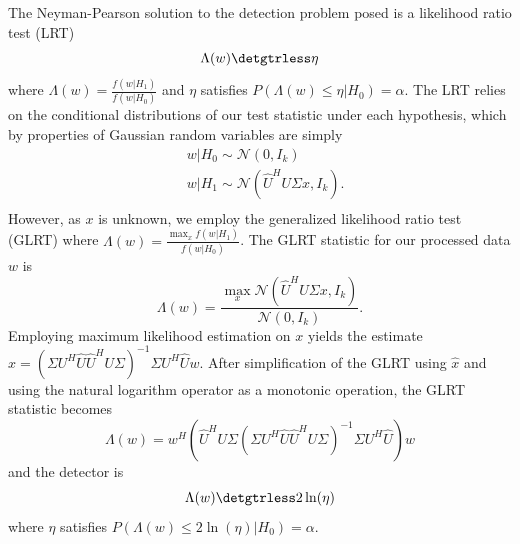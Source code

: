 The Neyman-Pearson solution to the detection problem posed is a likelihood ratio test (LRT)
\begin{equation*}
\Lambda(w) \detgtrless \eta
\end{equation*}
where $\Lambda(w) = \frac{f(w|H_1)}{f(w|H_0)}$ and $\eta$ satisfies $P(\Lambda(w)\leq\eta|H_0)=\alpha$. The LRT relies on the conditional distributions of our test statistic under each hypothesis, which by properties of Gaussian random variables are simply
\begin{equation*}
\begin{aligned}
&w|H_0\sim\mathcal{N}(0,I_{k})\\
&w|H_1\sim\mathcal{N}(\widehat{U}^HU\Sigma x, I_{k}).\\
\end{aligned}
\end{equation*}
However, as $x$ is unknown, we employ the generalized likelihood ratio test (GLRT) where $\Lambda(w) = \frac{\max_x f(w|H_1)}{f(w|H_0)}$. The GLRT statistic for our processed data $w$ is
\begin{equation*}
\Lambda(w)=\frac{\max_x\mathcal{N}(\widehat{U}^HU\Sigma x,I_{k})}{\mathcal{N}(0,I_{k})}.
\end{equation*}
Employing maximum likelihood estimation on $x$ yields the estimate $\widehat{x}=\left(\Sigma U^H\widehat{U}\widehat{U}^HU\Sigma\right)^{-1}\Sigma U^H\widehat{U}w$. After simplification of the GLRT using $\widehat{x}$ and using the natural logarithm operator as a monotonic operation, the GLRT statistic becomes
\begin{equation}\label{eq:oracle stat}
\Lambda(w) = w^H\left(\widehat{U}^HU\Sigma\left(\Sigma U^H\widehat{U}\widehat{U}^HU\Sigma\right)^{-1}\Sigma U^H\widehat{U}\right)w
\end{equation}
and the detector is
\begin{equation*}
\Lambda(w) \detgtrless 2\ln(\eta)
\end{equation*}
where $\eta$ satisfies $P(\Lambda(w)\leq2\ln\left(\eta\right)|H_0)=\alpha$.

